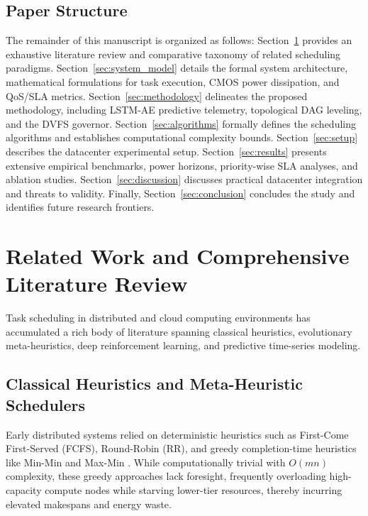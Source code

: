 \documentclass[default,sn-mathphys-num]{sn-jnl}
\theoremstyle{thmstyleone}
\theoremstyle{thmstyletwo}
\theoremstyle{thmstylethree}
\begin{document}
\subsection{Paper Structure}
The remainder of this manuscript is organized as follows: Section~\ref{sec:related} provides an exhaustive literature review and comparative taxonomy of related scheduling paradigms. Section~\ref{sec:system_model} details the formal system architecture, mathematical formulations for task execution, CMOS power dissipation, and QoS/SLA metrics. Section~\ref{sec:methodology} delineates the proposed methodology, including LSTM-AE predictive telemetry, topological DAG leveling, and the DVFS governor. Section~\ref{sec:algorithms} formally defines the scheduling algorithms and establishes computational complexity bounds. Section~\ref{sec:setup} describes the datacenter experimental setup. Section~\ref{sec:results} presents extensive empirical benchmarks, power horizons, priority-wise SLA analyses, and ablation studies. Section~\ref{sec:discussion} discusses practical datacenter integration and threats to validity. Finally, Section~\ref{sec:conclusion} concludes the study and identifies future research frontiers.

\section{Related Work and Comprehensive Literature Review}\label{sec:related}

Task scheduling in distributed and cloud computing environments has accumulated a rich body of literature spanning classical heuristics, evolutionary meta-heuristics, deep reinforcement learning, and predictive time-series modeling.

\subsection{Classical Heuristics and Meta-Heuristic Schedulers}
Early distributed systems relied on deterministic heuristics such as First-Come First-Served (FCFS), Round-Robin (RR), and greedy completion-time heuristics like Min-Min and Max-Min \cite{kumar2020energy}. While computationally trivial with $O(mn)$ complexity, these greedy approaches lack foresight, frequently overloading high-capacity compute nodes while starving lower-tier resources, thereby incurring elevated makespans and energy waste.
\end{document}
